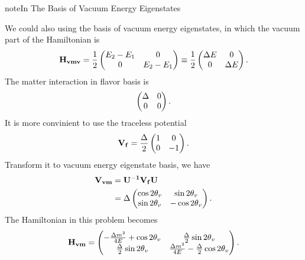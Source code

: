 \documentclass[letterpaper,12pt,english]{sphinxmanual}
\begin{document}
\begin{notice}{note}{In The Basis of Vacuum Energy Eigenstates}

We could also using the basis of vacuum energy eigenstates, in which the vacuum part of the Hamiltonian is
\begin{gather}
\begin{split}\mathbf{H_{vmv}} = \frac{1}{2} \begin{pmatrix}
E_2 - E_1 & 0 \\
0 & E_2 - E_1
\end{pmatrix} \equiv  \frac{1}{2} \begin{pmatrix}
\Delta E & 0 \\
0 & \Delta E
\end{pmatrix} .\end{split}\notag
\end{gather}
The matter interaction in flavor basis is
\begin{gather}
\begin{split}\begin{pmatrix}
\Delta & 0 \\
0 & 0
\end{pmatrix}.\end{split}\notag
\end{gather}
It is more convinient to use the traceless potential
\begin{gather}
\begin{split}\mathbf{V_{f}} = \frac{\Delta}{2}\begin{pmatrix}
1 & 0 \\
0 & -1
\end{pmatrix}.\end{split}\notag
\end{gather}
Transform it to vacuum energy eigenstate basis, we have
\begin{gather}
\begin{split}\mathbf{V_{vm}} &= \mathbf{U^{-1}}\mathbf{V_{f}} \mathbf{U} \\
& = \Delta \begin{pmatrix}
\cos 2\theta_v & \sin 2\theta_v \\
\sin 2\theta_v  & - \cos 2\theta_v
\end{pmatrix}.\end{split}\notag
\end{gather}
The Hamiltonian in this problem becomes
\begin{gather}
\begin{split}\mathbf{H_{vm}} = \begin{pmatrix}
- \frac{\Delta m^2}{4E}+\cos 2\theta_v & \frac{\Delta}{2} \sin 2\theta_v \\
\frac{\Delta}{2} \sin 2\theta_v & \frac{\Delta m^2}{4E} -  \frac{\Delta}{2} \cos 2\theta_v
\end{pmatrix}.\end{split}\notag
\end{gather}\end{notice}
\end{document}
